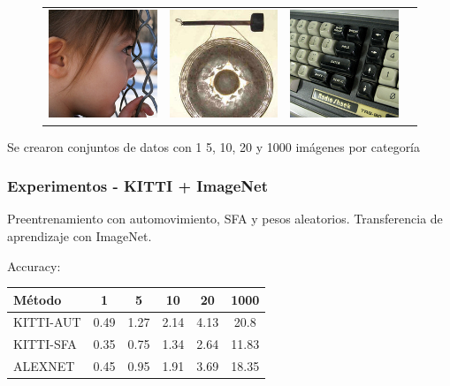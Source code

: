 \documentclass{beamer}
\begin{document}
\begin{frame}
\begin{figure}
{\begin{tabular}{cccc}
\includegraphics[width = 1.5in]{./images/imagenet/n03000134_789.JPEG} &
\includegraphics[width = 1.5in]{./images/imagenet/n03017168_743.JPEG} &
\includegraphics[width = 1.5in]{./images/imagenet/n03085013_2149.JPEG} \\
\end{tabular}
}
\end{figure}
\vfill
Se crearon conjuntos de datos con 1 5, 10, 20 y 1000 imágenes por categoría
\vfill
\end{frame}





\begin{frame}
\frametitle{Experimentos - KITTI + ImageNet}

Preentrenamiento con automovimiento, SFA y pesos aleatorios.\pause
\vfill
Transferencia de aprendizaje con ImageNet.\pause
\vfill

Accuracy:
\begin{table}
\centering
\begin{tabular}{l|ccccc}
\hline
\multicolumn{1}{l}{Método}
& \multicolumn{1}{c}{1}
& \multicolumn{1}{c}{5}
& \multicolumn{1}{c}{10}
& \multicolumn{1}{c}{20}
& \multicolumn{1}{c}{1000} \\ \cline{1-6}
\hline

KITTI-AUT & 0.49 & 1.27 & 2.14 & 4.13 & 20.8\\
KITTI-SFA & 0.35 & 0.75 & 1.34 & 2.64 & 11.83\\
ALEXNET & 0.45 & 0.95 & 1.91 & 3.69 & 18.35\\

\hline
\end{tabular}
\end{table}
\end{frame}
\end{document}
